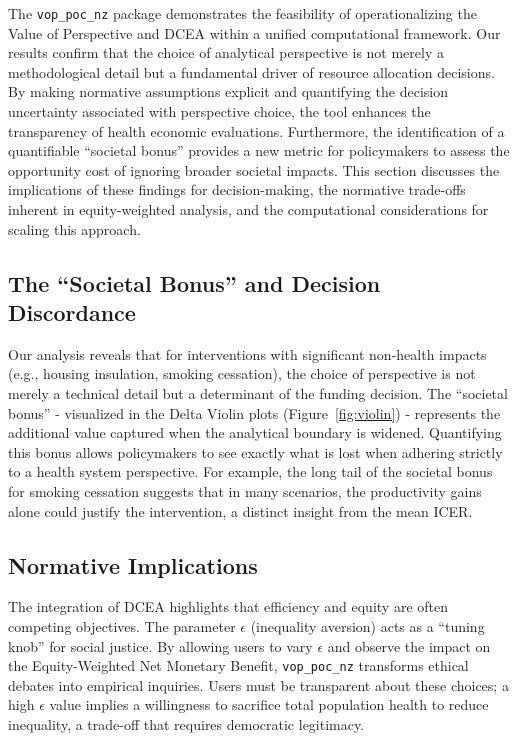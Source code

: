 \documentclass{article}
\newcommand{\pkg}[1]{\texttt{#1}}
\begin{document}
The \pkg{vop\_poc\_nz} package demonstrates the feasibility of operationalizing the Value of Perspective and DCEA within a unified computational framework.
Our results confirm that the choice of analytical perspective is not merely a methodological detail but a fundamental driver of resource allocation decisions.
By making normative assumptions explicit and quantifying the decision uncertainty associated with perspective choice, the tool enhances the transparency of health economic evaluations.
Furthermore, the identification of a quantifiable ``societal bonus'' provides a new metric for policymakers to assess the opportunity cost of ignoring broader societal impacts.
This section discusses the implications of these findings for decision-making, the normative trade-offs inherent in equity-weighted analysis, and the computational considerations for scaling this approach.

\subsection{The ``Societal Bonus'' and Decision Discordance}
Our analysis reveals that for interventions with significant non-health impacts (e.g., housing insulation, smoking cessation), the choice of perspective is not merely a technical detail but a determinant of the funding decision.
The ``societal bonus'' - visualized in the Delta Violin plots (Figure~\ref{fig:violin}) - represents the additional value captured when the analytical boundary is widened.
Quantifying this bonus allows policymakers to see exactly what is lost when adhering strictly to a health system perspective.
For example, the long tail of the societal bonus for smoking cessation suggests that in many scenarios, the productivity gains alone could justify the intervention, a distinct insight from the mean ICER.

\subsection{Normative Implications}
The integration of DCEA highlights that efficiency and equity are often competing objectives.
The parameter $\epsilon$ (inequality aversion) acts as a ``tuning knob'' for social justice.
By allowing users to vary $\epsilon$ and observe the impact on the Equity-Weighted Net Monetary Benefit, \pkg{vop\_poc\_nz} transforms ethical debates into empirical inquiries.
Users must be transparent about these choices; a high $\epsilon$ value implies a willingness to sacrifice total population health to reduce inequality, a trade-off that requires democratic legitimacy.
\end{document}
